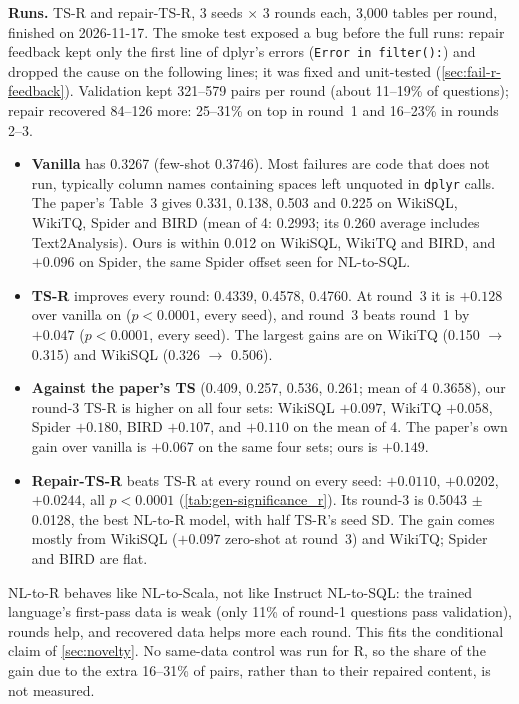 \textbf{Runs.} TS-R and repair-TS-R, 3 seeds $\times$ 3 rounds each, 3,000 tables per round, finished on
2026-11-17. The smoke test exposed a bug before the full runs: repair feedback kept only the first line of dplyr's
errors (\texttt{Error in filter():}) and dropped the cause on the following lines; it was fixed and unit-tested
(\cref{sec:fail-r-feedback}). Validation kept 321--579 pairs per round (about 11--19\% of questions); repair recovered
84--126 more: 25--31\% on top in round~1 and 16--23\% in rounds 2--3.




\begin{observation}
\begin{itemize}
\item \textbf{Vanilla} has \ZSiv{} 0.3267 (few-shot 0.3746). Most failures are code that does not run, typically column
names containing spaces left unquoted in \texttt{dplyr} calls. The paper's Table~3 gives 0.331, 0.138, 0.503 and
0.225 on WikiSQL, WikiTQ, Spider and BIRD (mean of 4: 0.2993; its 0.260 average includes Text2Analysis). Ours is within
0.012 on WikiSQL, WikiTQ and BIRD, and $+0.096$ on Spider, the same Spider offset seen for NL-to-SQL.
\item \textbf{TS-R} improves every round: \ZSiv{} 0.4339, 0.4578, 0.4760. At round~3 it is $+0.128$ over vanilla on
\Mviii{} ($p<0.0001$, every seed), and round~3 beats round~1 by $+0.047$ ($p<0.0001$, every seed). The largest gains
are on WikiTQ (0.150 $\to$ 0.315) and WikiSQL (0.326 $\to$ 0.506).
\item \textbf{Against the paper's TS} (0.409, 0.257, 0.536, 0.261; mean of 4 0.3658), our round-3 TS-R is higher on all
four sets: WikiSQL $+0.097$, WikiTQ $+0.058$, Spider $+0.180$, BIRD $+0.107$, and $+0.110$ on the mean of 4. The paper's
own gain over vanilla is $+0.067$ on the same four sets; ours is $+0.149$.
\item \textbf{Repair-TS-R} beats TS-R at every round on every seed: \Mviii{} $+0.0110$, $+0.0202$, $+0.0244$, all
$p<0.0001$ (\cref{tab:gen-significance_r}). Its round-3 \ZSiv{} is 0.5043 $\pm$ 0.0128, the best NL-to-R model, with
half TS-R's seed SD. The gain comes mostly from WikiSQL ($+0.097$ zero-shot at round~3) and WikiTQ; Spider and BIRD
are flat.
\end{itemize}
\end{observation}

\begin{interpretation}
NL-to-R behaves like NL-to-Scala, not like Instruct NL-to-SQL: the trained language's first-pass data is weak (only
11\% of round-1 questions pass validation), rounds help, and recovered data helps more each round. This fits the
conditional claim of \cref{sec:novelty}. No same-data control was run for R, so the share of the gain due to the extra
16--31\% of pairs, rather than to their repaired content, is not measured.
\end{interpretation}

